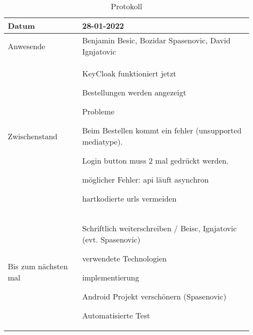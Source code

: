 \begin{table}
    \begin{tabular}{ |p{3cm}|p{10cm}|  }
        \hline
        Datum & 28-01-2022\\
        \hline
        Anwesende & Benjamin Besic, Bozidar Spasenovic, David Ignjatovic\\

        \hline
        Zwischenstand& 

        KeyCloak funktioniert jetzt
    
        Bestellungen werden angezeigt
    
   Probleme
    
        Beim Bestellen kommt ein fehler (unsupported mediatype).
    
        Login button muss 2 mal gedrückt werden.
    
            möglicher Fehler: api läuft asynchron
    
        hartkodierte urls vermeiden
    
    \\
        \hline
        Bis zum nächsten mal &  

        Schriftlich weiterschreiben / Beisc, Ignjatovic (evt. Spasenovic)
    
            verwendete Technologien
    
            implementierung
    
        Android Projekt verschönern (Spasenovic)
    
        Automatisierte Test
    \\
        \hline
    \end{tabular}
    \caption{Protokoll}
    \label{tab:my_label}
\end{table}
